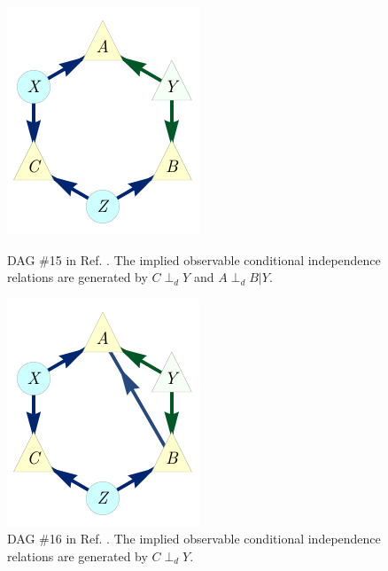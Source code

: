 \documentclass[aps,english,superscriptaddress,onecolumn,twoside,longbibliography,pra,floatfix,fleqn,nofootinbib]{revtex4-1}%
\theoremstyle{definition}
\newcommand{\aindep}{\ensuremath{\cramp{\perp_d}}} %
\newcommand{\cramp}[1]{\ensuremath{\mathord{#1}}}
\begin{document}
\begin{figure}[h]
\centering
\begin{minipage}[t]{0.3\linewidth}
\centering
\includegraphics[scale=1]{scen15DAG.pdf}
\caption{DAG \#15 in Ref. \cite{pusey2014gdag}. The implied observable conditional independence relations are generated by $C\aindep Y$ and $A \aindep B|Y$.}\label{fig:GDAG15}
\end{minipage}
\hfill
\begin{minipage}[t]{0.3\linewidth}
\centering
\includegraphics[scale=1]{scen16DAG.pdf}
\caption{DAG \#16 in Ref. \cite{pusey2014gdag}. The implied observable conditional independence relations are generated by $C\aindep Y$.}\label{fig:GDAG16}
\end{minipage}
\hfill
\begin{minipage}[t]{0.3\linewidth}
\centering

\end{minipage}
\end{figure}
\end{document}

